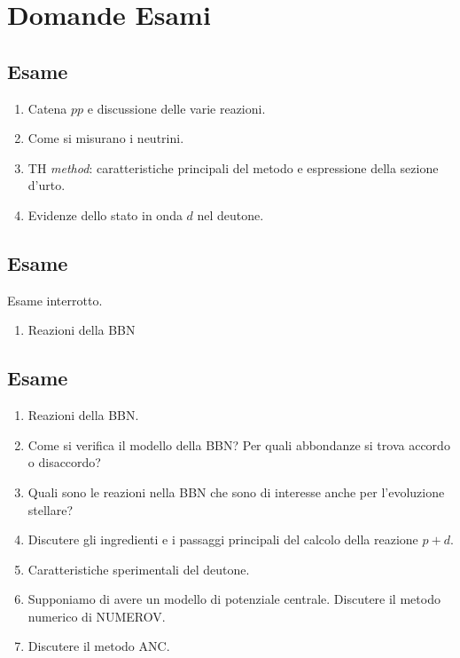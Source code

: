 \chapter{Domande Esami}

\section{Esame}
\begin{enumerate}
	\item Catena $pp$ e discussione delle varie reazioni.
	\item Come si misurano i neutrini.
	\item TH \textit{method}: caratteristiche principali del metodo e espressione della sezione d'urto.
	\item Evidenze dello stato in onda $d$ nel deutone.
\end{enumerate}
\section{Esame}
Esame interrotto.
\begin{enumerate}
	\item Reazioni della BBN
\end{enumerate}
\section{Esame}
\begin{enumerate}
	\item Reazioni della BBN.
	\item Come si verifica il modello della BBN? Per quali abbondanze si trova accordo o disaccordo?
	\item Quali sono le reazioni nella BBN che sono di interesse anche per l'evoluzione stellare?
	\item Discutere gli ingredienti e i passaggi principali del calcolo della reazione $p+d$.
	\item Caratteristiche sperimentali del deutone.
	\item Supponiamo di avere un modello di potenziale centrale. Discutere il metodo numerico di NUMEROV.
	\item Discutere il metodo ANC. 
\end{enumerate}
